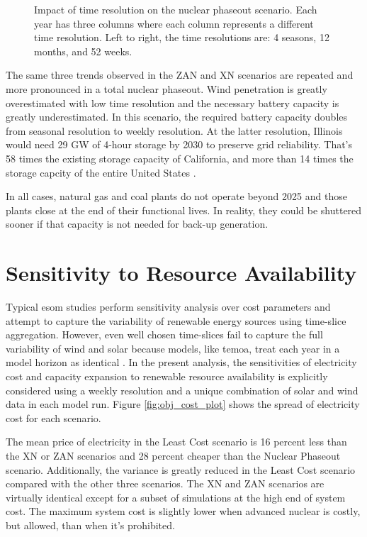 \begin{figure}[H]
  \centering
  \resizebox{0.95\columnwidth}{!}{}
  \caption{Impact of time resolution on the nuclear phaseout scenario. Each year has three
  columns where each column represents a different time resolution. Left to right, the time
  resolutions are: 4 seasons, 12 months, and 52 weeks.}
  \label{fig:time_res_ZN}
\end{figure}

The same three trends observed in the ZAN and XN scenarios are repeated and
more pronounced in a total nuclear phaseout. Wind penetration is greatly overestimated
with low time resolution and the necessary battery capacity is greatly underestimated.
In this scenario, the required battery capacity doubles from seasonal resolution to
weekly resolution. At the latter resolution, Illinois would need 29 GW of 4-hour
storage by 2030 to preserve grid reliability. That's 58 times the existing storage capacity
of California, and more than 14 times the storage capcity of the entire United States
\cite{hutchins_us_2021}.

In all cases, natural gas and coal plants do not operate beyond 2025
and those plants close at the end of their functional lives. In reality, they could be
shuttered sooner if that capacity is not needed for back-up generation.

\section{Sensitivity to Resource Availability}

Typical \gls{esom} studies perform sensitivity analysis over cost parameters and
attempt to capture the variability of renewable energy sources using time-slice
aggregation. However, even well chosen time-slices fail to capture the full variability
of wind and solar because models, like \gls{temoa}, treat each year in a model
horizon as identical \cite{hunter_modeling_2013}. In the present analysis, the
sensitivities of electricity cost and capacity expansion to renewable resource
availability is explicitly considered using a weekly resolution and a unique combination
of solar and wind data in each model run. Figure \ref{fig:obj_cost_plot} shows
the spread of electricity cost for each scenario.

The mean price of electricity in the Least Cost scenario is 16 percent less than
the XN or ZAN scenarios and 28 percent cheaper than the Nuclear Phaseout scenario.
Additionally, the variance is greatly reduced in the Least Cost scenario compared
with the other three scenarios. The XN and ZAN scenarios are virtually identical
except for a subset of simulations at the high end of system cost. The maximum
system cost is slightly lower when advanced nuclear is costly, but allowed,
than when it's prohibited.

